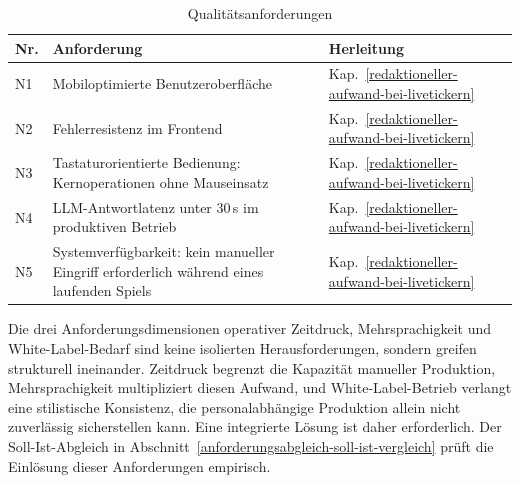 \begin{longtable}[]{@{}
  >{\raggedright\arraybackslash}p{}
  >{\raggedright\arraybackslash}p{}
  >{\raggedright\arraybackslash}p{}@{}}
\caption{Qualitätsanforderungen}\label{tab:qualitaetsanforderungen}\\
\toprule\noalign{}
\begin{minipage}[b]{\linewidth}\raggedright
Nr.
\end{minipage} & \begin{minipage}[b]{\linewidth}\raggedright
Anforderung
\end{minipage} & \begin{minipage}[b]{\linewidth}\raggedright
Herleitung
\end{minipage} \\
\midrule\noalign{}
\endhead
\bottomrule\noalign{}
\endlastfoot
N1 & Mobiloptimierte Benutzeroberfläche & Kap.~\ref{redaktioneller-aufwand-bei-livetickern} \\
N2 & Fehlerresistenz im Frontend & Kap.~\ref{redaktioneller-aufwand-bei-livetickern} \\
N3 & Tastaturorientierte Bedienung: Kernoperationen ohne Mauseinsatz & Kap.~\ref{redaktioneller-aufwand-bei-livetickern} \\
N4 & LLM-Antwortlatenz unter 30\,s im produktiven Betrieb & Kap.~\ref{redaktioneller-aufwand-bei-livetickern} \\
N5 & Systemverfügbarkeit: kein manueller Eingriff erforderlich während eines laufenden Spiels & Kap.~\ref{redaktioneller-aufwand-bei-livetickern} \\
\end{longtable}


Die drei Anforderungsdimensionen operativer Zeitdruck, Mehrsprachigkeit und White-Label-Bedarf sind keine isolierten Herausforderungen, sondern greifen strukturell ineinander. Zeitdruck begrenzt die Kapazität manueller Produktion, Mehrsprachigkeit multipliziert diesen Aufwand, und White-Label-Betrieb verlangt eine stilistische Konsistenz, die personalabhängige Produktion allein nicht zuverlässig sicherstellen kann. Eine integrierte Lösung ist daher erforderlich. Der Soll-Ist-Abgleich in Abschnitt~\ref{anforderungsabgleich-soll-ist-vergleich} prüft die Einlösung dieser Anforderungen empirisch.
